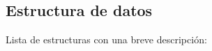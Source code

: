 \subsection{Estructura de datos}
Lista de estructuras con una breve descripción\+:\begin{DoxyCompactList}
\item{}
\end{DoxyCompactList}
